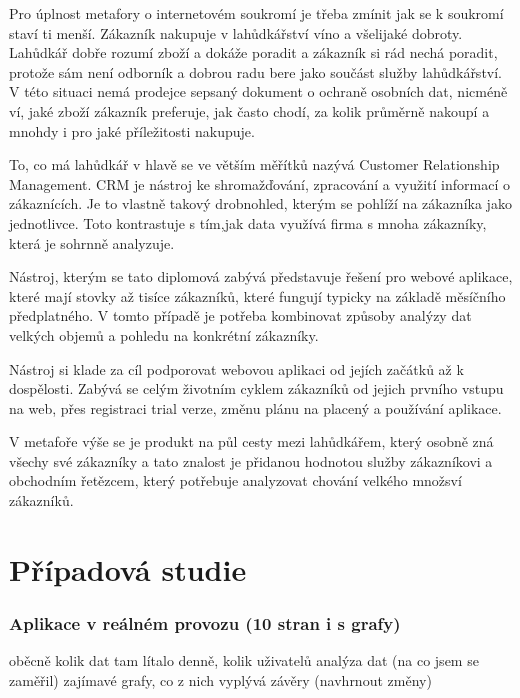 \documentclass[bc,female,java,dept456]{diploma}						%
\begin{document}
Pro úplnost metafory o internetovém soukromí je třeba zmínit jak se k soukromí staví ti menší. Zákazník nakupuje v lahůdkářství víno a všelijaké dobroty. Lahůdkář dobře rozumí zboží a dokáže poradit a zákazník si rád nechá poradit,  protože sám není odborník a dobrou radu bere jako součást služby lahůdkářství. V této situaci nemá prodejce sepsaný dokument o ochraně osobních dat, nicméně ví, jaké zboží zákazník preferuje, jak často chodí, za kolik průměrně nakoupí a mnohdy i pro jaké příležitosti nakupuje.

To, co má lahůdkář v hlavě se ve větším měřítků nazývá Customer Relationship Management. CRM je nástroj ke shromažďování, zpracování a využití informací o zákaznících. Je to vlastně takový drobnohled, kterým se pohlíží na zákazníka jako jednotlivce. Toto kontrastuje s tím,jak data využívá firma s mnoha zákazníky, která je sohrnně analyzuje.

\bigskip

Nástroj, kterým se tato diplomová zabývá představuje řešení pro webové aplikace, které mají stovky až tisíce zákazníků, které fungují typicky na základě měsíčního předplatného. V tomto případě je potřeba kombinovat způsoby analýzy dat velkých objemů a pohledu na konkrétní zákazníky. 

Nástroj si klade za cíl podporovat webovou aplikaci od jejích začátků až k dospělosti. Zabývá se celým životním cyklem zákazníků od jejich prvního vstupu na web, přes registraci trial verze, změnu plánu na placený a používání aplikace.

V metafoře výše se je produkt na půl cesty mezi lahůdkářem, který osobně zná všechy své zákazníky a tato znalost je přidanou hodnotou služby zákazníkovi a obchodním řetězcem, který potřebuje analyzovat chování velkého množsví zákazníků.









\section{Případová studie}

\subsubsection{Aplikace v reálném provozu (10 stran i s grafy)}

oběcně kolik dat tam lítalo denně, kolik uživatelů
analýza dat (na co jsem se zaměřil)
zajímavé grafy, co z nich vyplývá
závěry (navhrnout změny)
\end{document}
